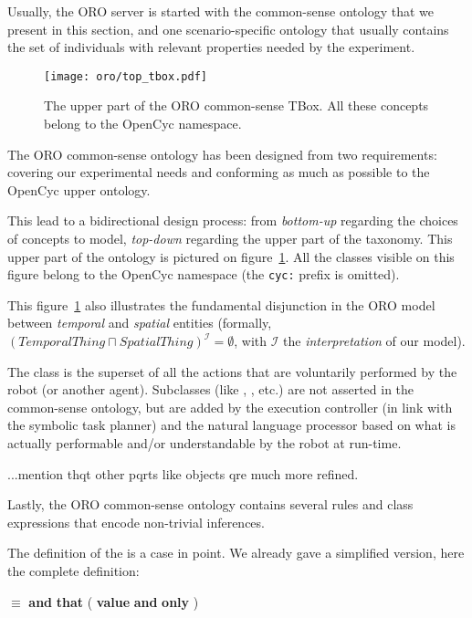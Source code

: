 Usually, the ORO server is started with the common-sense ontology that we
present in this section, and one scenario-specific ontology that usually
contains the set of individuals with relevant properties needed by the
experiment.

\begin{figure}
    \centering
    \texttt{[image: oro/top\_tbox.pdf]}

    \caption{The upper part of the ORO common-sense TBox. All these concepts
    belong to the {\sc OpenCyc} namespace.}
    
    \label{fig|upper_tbox}
\end{figure}

The ORO common-sense ontology has been designed from two requirements: covering
our experimental needs and conforming as much as possible to the {\sc OpenCyc}
upper ontology.

This lead to a bidirectional design process: from \emph{bottom-up} regarding
the choices of concepts to model, \emph{top-down} regarding the upper part of the
taxonomy. This upper part of the ontology is pictured on
figure~\ref{fig|upper_tbox}. All the classes visible on this figure belong to the
{\sc OpenCyc} namespace (the {\tt cyc:} prefix is omitted).

This figure~\ref{fig|upper_tbox} also illustrates the fundamental disjunction
in the ORO model between \emph{temporal} and \emph{spatial} entities (formally,
$(TemporalThing \sqcap SpatialThing)^{\mathcal{I}} = \emptyset$, with
$\mathcal{I}$ the \emph{interpretation} of our model).

The class  is the superset of all the actions that
are voluntarily performed by the robot (or another agent). Subclasses (like
, , etc.) are not asserted in the common-sense
ontology, but are added by the execution controller (in link with the symbolic
task planner) and the natural language processor based on what is actually
performable and/or understandable by the robot at run-time.

...mention thqt other pqrts like objects qre much more refined.

Lastly, the ORO common-sense ontology contains several rules and class
expressions that encode non-trivial inferences.

The definition of the  is a case in point. We already gave a
simplified version, here the complete definition:

 $\equiv$  {\bf and} 
{\bf that} ( {\bf value}  {\bf and}
 {\bf only} )

